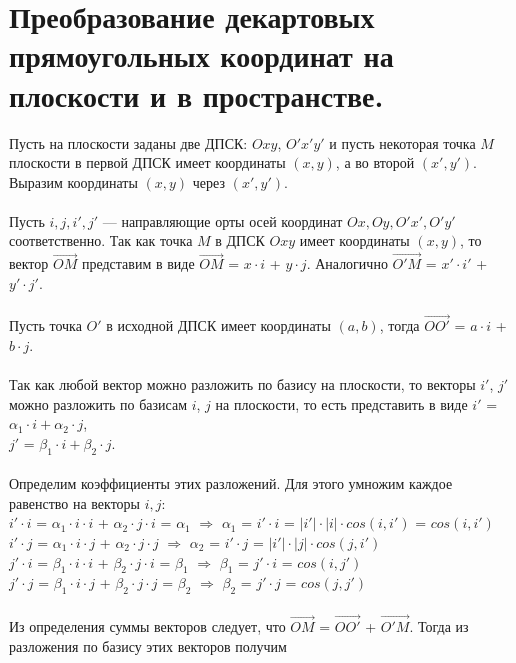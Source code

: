 \section{Преобразование декартовых прямоугольных координат на плоскости и в пространстве.}
Пусть на плоскости заданы две ДПСК: $Oxy$, $O'x'y'$ и пусть некоторая точка $M$ плоскости в первой ДПСК имеет координаты $(x, y)$, а во второй $(x', y')$. Выразим координаты $(x, y)$ через $(x', y')$. \\\\Пусть $i, j, i', j'$ --- направляющие орты осей координат $Ox, Oy, O'x', O'y'$ соответственно. Так как точка $M$ в ДПСК $Oxy$ имеет координаты $(x, y)$, то вектор $\overrightarrow{OM}$ представим в виде $\overrightarrow{OM}$ = $x \cdot i$ + $y \cdot j$.
Аналогично $\overrightarrow{O' M}$ = $x' \cdot i'$ + $y' \cdot j'$. \\\\
Пусть точка $O'$ в исходной ДПСК имеет координаты $(a, b)$, тогда $\overrightarrow{O O'}$ = $a \cdot i$ + $b \cdot j$. \\\\
Так как любой вектор можно разложить по базису на плоскости, то векторы $i'$, $j'$ можно разложить по базисам $i$, $j$ на плоскости, то есть представить в виде $i'$ = $\alpha_1 \cdot i + \alpha_2 \cdot j$, \\ $j'$ = $\beta_1 \cdot i + \beta_2 \cdot j$. \\\\Определим коэффициенты этих разложений. Для этого умножим каждое равенство на векторы $i, j$: \\
$i'\cdot i$ = $\alpha_1 \cdot i \cdot i$ + $\alpha_2 \cdot j \cdot i$ = $\alpha_1$ $\Rightarrow$ $\alpha_1$ = $i' \cdot i$ = $|i'| \cdot |i| \cdot cos(i, i')$ = $cos(i, i')$ \\
$i' \cdot j$ = $\alpha_1 \cdot i \cdot j$ + $\alpha_2 \cdot j \cdot j$ $\Rightarrow$ $\alpha_2$ = $i' \cdot j$ = $|i'| \cdot |j| \cdot cos(j, i')$ \\
$j' \cdot i$ = $\beta_1 \cdot i \cdot i$ + $\beta_2 \cdot j \cdot i$ = $\beta_1$ $\Rightarrow$ $\beta_1$ = $j' \cdot i$ =  $cos(i, j')$ \\
$j' \cdot j$ = $\beta_1 \cdot i \cdot j$ + $\beta_2 \cdot j \cdot j$ = $\beta_2$ $\Rightarrow$ $\beta_2$ = $j' \cdot j$ =  $cos(j, j')$ \\\\
Из определения суммы векторов следует, что
$\overrightarrow{OM}$ = $\overrightarrow{O O'}$ + $\overrightarrow{O' M}$. Тогда из разложения по базису этих векторов получим \\
